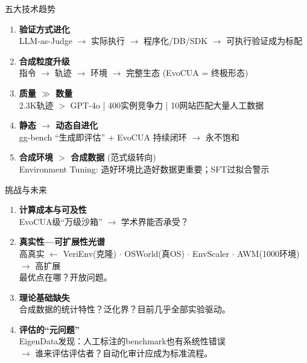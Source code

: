 \documentclass[aspectratio=169, 11pt]{beamer}
\begin{document}
\begin{frame}{五大技术趋势}
\begin{enumerate}
    \setlength\itemsep{7pt}
    \item \textbf{验证方式进化}\\
    {\small LLM-as-Judge $\rightarrow$ 实际执行 $\rightarrow$ 程序化/DB/SDK $\rightarrow$ 可执行验证成为标配}

    \item \textbf{合成粒度升级}\\
    {\small 指令 $\rightarrow$ 轨迹 $\rightarrow$ 环境 $\rightarrow$ 完整生态 \quad (EvoCUA = 终极形态)}

    \item \textbf{质量 $\gg$ 数量}\\
    {\small 2.3K轨迹 $>$ GPT-4o \;\;|\;\; 400实例竞争力 \;\;|\;\; 10网站匹配大量人工数据}

    \item \textbf{静态 $\rightarrow$ 动态自进化}\\
    {\small gg-bench ``生成即评估'' + EvoCUA 持续闭环 $\rightarrow$ 永不饱和}

    \item \textbf{合成环境 $>$ 合成数据} {\small (范式级转向)}\\
    {\small Environment Tuning: 造好环境比造好数据更重要；SFT过拟合警示}
\end{enumerate}
\end{frame}

\begin{frame}{挑战与未来}
\begin{enumerate}
    \setlength\itemsep{8pt}
    \item \textbf{计算成本与可及性}\\
    {\small EvoCUA级``万级沙箱'' $\rightarrow$ 学术界能否承受？}

    \item \textbf{真实性---可扩展性光谱}\\
    {\small 高真实 $\leftarrow$ VeriEnv(克隆) $\cdot$ OSWorld(真OS) $\cdot$ EnvScaler $\cdot$ AWM(1000环境) $\rightarrow$ 高扩展}\\
    {\small 最优点在哪？开放问题。}

    \item \textbf{理论基础缺失}\\
    {\small 合成数据的统计特性？泛化界？目前几乎全部实验驱动。}

    \item \textbf{评估的``元问题''}\\
    {\small EigenData发现：人工标注的benchmark也有系统性错误}\\
    {\small $\rightarrow$ 谁来评估评估者？自动化审计应成为标准流程。}
\end{enumerate}
\end{frame}
\end{document}
